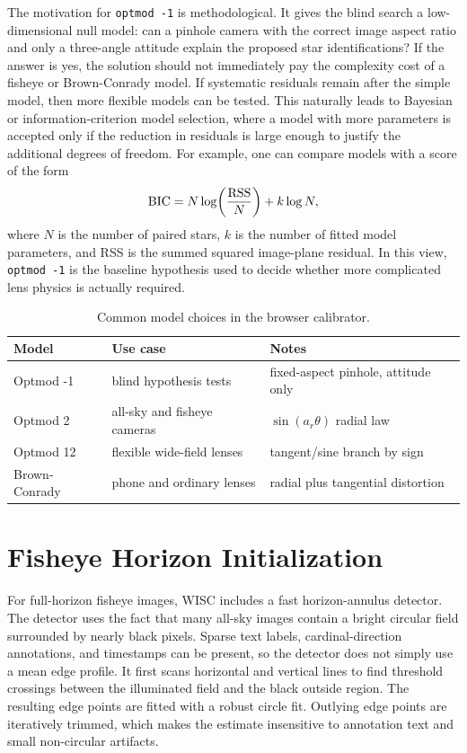 \documentclass[11pt]{article}
\begin{document}
The motivation for \texttt{optmod -1} is methodological. It gives the blind
search a low-dimensional null model: can a pinhole camera with the correct
image aspect ratio and only a three-angle attitude explain the proposed star
identifications? If the answer is yes, the solution should not immediately pay
the complexity cost of a fisheye or Brown-Conrady model. If systematic
residuals remain after the simple model, then more flexible models can be
tested. This naturally leads to Bayesian or information-criterion model
selection, where a model with more parameters is accepted only if the reduction
in residuals is large enough to justify the additional degrees of freedom.
For example, one can compare models with a score of the form
\[
  {\rm BIC} = N\log\!\left(\frac{{\rm RSS}}{N}\right) + k\log N,
\]
where \(N\) is the number of paired stars, \(k\) is the number of fitted model
parameters, and RSS is the summed squared image-plane residual. In this view,
\texttt{optmod -1} is the baseline hypothesis used to decide whether more
complicated lens physics is actually required.

\begin{table}[h]
\centering
\begin{tabular}{lll}
\toprule
Model & Use case & Notes \\
\midrule
Optmod -1 & blind hypothesis tests & fixed-aspect pinhole, attitude only \\
Optmod 2 & all-sky and fisheye cameras & \(\sin(a_r\theta)\) radial law \\
Optmod 12 & flexible wide-field lenses & tangent/sine branch by sign \\
Brown-Conrady & phone and ordinary lenses & radial plus tangential distortion \\
\bottomrule
\end{tabular}
\caption{Common model choices in the browser calibrator.}
\end{table}

\section{Fisheye Horizon Initialization}

For full-horizon fisheye images, WISC includes a fast horizon-annulus detector.
The detector uses the fact that many all-sky images contain a bright circular
field surrounded by nearly black pixels. Sparse text labels, cardinal-direction
annotations, and timestamps can be present, so the detector does not simply use
a mean edge profile. It first scans horizontal and vertical lines to find
threshold crossings between the illuminated field and the black outside region.
The resulting edge points are fitted with a robust circle fit. Outlying edge
points are iteratively trimmed, which makes the estimate insensitive to
annotation text and small non-circular artifacts.
\end{document}
